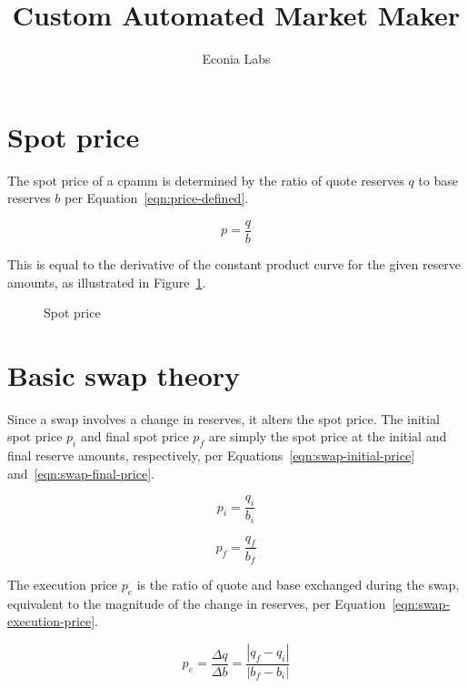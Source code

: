 \documentclass[table, twocolumn]{article}
\title{Custom Automated Market Maker}
\author{Econia Labs}
\date{}
\begin{document}

\maketitle

\section{Spot price}\label{sec:spot-price}

The spot price of a \gls*{cpamm} is determined by the ratio of quote reserves $q$ to
base reserves $b$ per Equation~\ref{eqn:price-defined}.

\begin{equation}\label{eqn:price-defined}
	p = \frac{q}{b}
\end{equation}

This is equal to the derivative of the constant product curve for the given reserve
amounts, as illustrated in Figure~\ref{fig:spot-price}.

\begin{figure}[!htb]
	\centering
	
	\caption{Spot price}\label{fig:spot-price}
\end{figure}

\section{Basic swap theory}\label{sec:basic-swap-theory}

Since a swap involves a change in reserves, it alters the spot price. The initial spot
price $p_i$ and final spot price $p_f$ are simply the spot price at the initial and
final reserve amounts, respectively, per Equations~\ref{eqn:swap-initial-price}
and~\ref{eqn:swap-final-price}.

\begin{equation}\label{eqn:swap-initial-price}
	p_i = \frac{q_i}{b_i}
\end{equation}

\begin{equation}\label{eqn:swap-final-price}
	p_f = \frac{q_f}{b_f}
\end{equation}

The execution price $p_e$ is the ratio of quote and base exchanged during the swap,
equivalent to the magnitude of the change in reserves, per
Equation~\ref{eqn:swap-execution-price}.

\begin{equation}\label{eqn:swap-execution-price}
	p_e = \frac{\Delta q}{\Delta b} = \frac{|q_f - q_i|}{|b_f - b_i|}
\end{equation}
\end{document}
